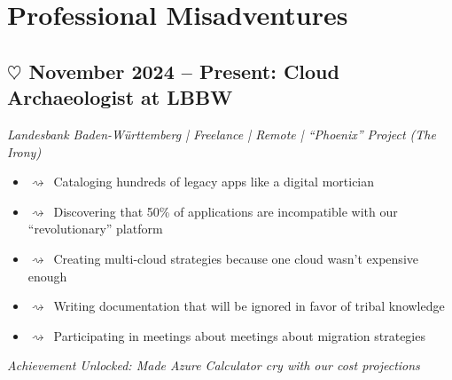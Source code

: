 \documentclass[11pt,a4paper]{article}
\newcommand{\heartstab}{{\color{heartcolor}$\heartsuit$}}
\newcommand{\squigglearrow}{{\color{squigglecolor}$\rightsquigarrow$}}
\begin{document}
\section{Professional Misadventures}
\subsection{\texorpdfstring{\heartstab}{} November 2024 -- Present: Cloud Archaeologist at LBBW}
\textit{Landesbank Baden-Württemberg | Freelance | Remote | ``Phoenix'' Project (The Irony)}
\begin{itemize}[leftmargin=*,itemsep=0pt]
    \item \squigglearrow\ Cataloging hundreds of legacy apps like a digital mortician
    \item \squigglearrow\ Discovering that 50\% of applications are incompatible with our ``revolutionary'' platform
    \item \squigglearrow\ Creating multi-cloud strategies because one cloud wasn't expensive enough
    \item \squigglearrow\ Writing documentation that will be ignored in favor of tribal knowledge
    \item \squigglearrow\ Participating in meetings about meetings about migration strategies
\end{itemize}
\textit{Achievement Unlocked: Made Azure Calculator cry with our cost projections}
\end{document}
